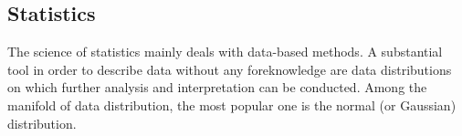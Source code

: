 



    


\subsection{Statistics}
\label{subsection:bg-statistics}

The science of statistics mainly deals with data-based methods. A substantial tool in order to describe data without any foreknowledge are data distributions on which further analysis and interpretation can be conducted. Among the manifold of data distribution, the most popular one is the normal (or Gaussian) distribution.
 

